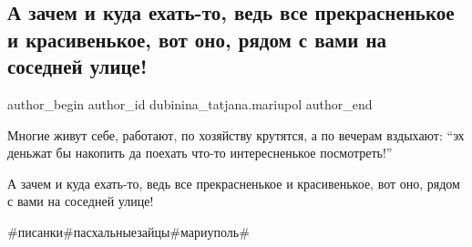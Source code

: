  
 
 
 
 

\subsection{А зачем и куда ехать-то, ведь все прекрасненькое и красивенькое, вот оно, рядом с вами на соседней улице!}
\label{sec:30_04_2019.fb.dubinina_tatjana.mariupol.1.rjadom_s_vami_prekrasnenkoje_na_sosednjej_ulice}

\ifcmt
 author_begin
   author_id dubinina_tatjana.mariupol
 author_end
\fi

Многие живут себе, работают, по хозяйству крутятся, а по вечерам вздыхают: \enquote{эх
деньжат бы накопить да поехать что-то интересненькое посмотреть!}

А зачем и куда ехать-то, ведь все прекрасненькое и красивенькое, вот оно, рядом
с вами на соседней улице!

\#писанки\#пасхальныезайцы\#мариуполь\#

